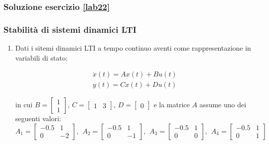 \documentclass[../main.tex]{subfiles}
\begin{document}
\subsubsection*{Soluzione esercizio \ref{lab22}}


\vspace*{1cm}
\subsubsection{Stabilità di sistemi dinamici LTI}
\label{lab23}

\begin{enumerate}
	\item Dati i sitemi dinamici LTI a tempo continuo aventi come rappresentazione in variabili di stato:
		
		\begin{equation}
		\begin{split}
			\dot x(t) = Ax(t) + Bu(t) \\
			y(t) = Cx(t) + Du(t)
		\end{split}	
		\end{equation}
		
		in cui $B=\begin{bmatrix}1\\1\end{bmatrix}$, $C=\begin{bmatrix} 1 & 3\end{bmatrix}$, $D=\begin{bmatrix} 0 \end{bmatrix}$ e la matrice $A$ assume uno dei seguenti valori:
		\begin{equation*}		
			A_1=\begin{bmatrix} -0.5 & 1 \\ 0 & -2 \end{bmatrix}, \hspace{5pt}
			A_2=\begin{bmatrix} -0.5 & 1 \\ 0 & -1\end{bmatrix}, \hspace{5pt}
			A_3=\begin{bmatrix} -0.5 & 1 \\ 0 & 0 \end{bmatrix}, \hspace{5pt}
			A_4=\begin{bmatrix} -0.5 & 1 \\ 0 & 1 \end{bmatrix}
		\end{equation*}
		

\end{enumerate}
\end{document}
